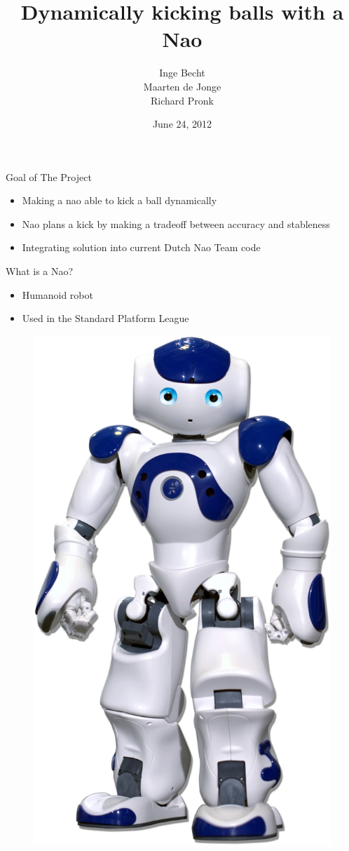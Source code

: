 \documentclass{beamer}
\title[Make a LaTeX presentation using Beamer]{Dynamically kicking balls with a
Nao}
\author{Inge Becht\\ Maarten de Jonge\\ Richard Pronk}
\institute{University of Amsterdam}
\date{June 24, 2012}
\begin{document}
\begin{frame}
\titlepage
\end{frame}

\begin{frame}{Goal of The Project}
    \begin{itemize}
        \item{Making a nao able to kick a ball dynamically}
        \item{Nao plans a kick by making a tradeoff between
             accuracy and stableness}
        \item{Integrating solution  into current Dutch Nao Team code}
    \end{itemize}
\end{frame}

\begin{frame}{What is a Nao?}
    \begin{itemize}
        \item{Humanoid robot}
        \item{Used in the Standard Platform League}
    \end{itemize}
     \begin{figure}[H] 
        \begin{center}
            \includegraphics[scale=0.2]{nao.jpg}

\end{center}
\end{figure}
\end{frame}
\end{document}
